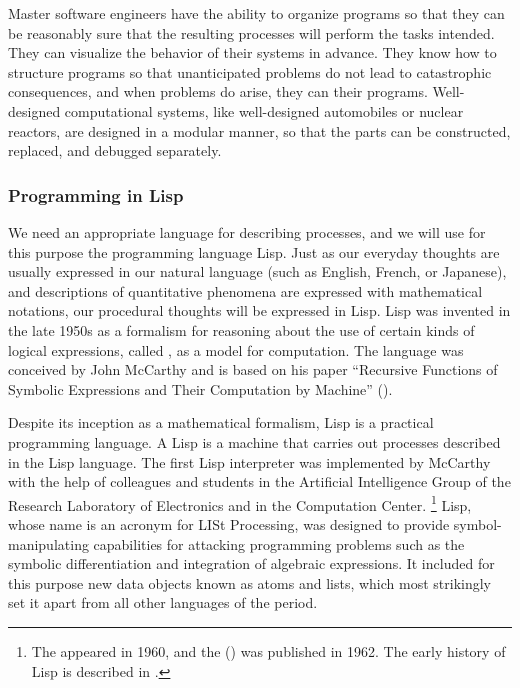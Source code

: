 Master software engineers have the ability to organize programs so that they can be reasonably sure that the resulting processes will perform the tasks intended.
They can visualize the behavior of their systems in advance.
They know how to structure programs so that unanticipated problems do not lead to catastrophic consequences, and when problems do arise, they can  their programs.
Well-designed computational systems, like well-designed automobiles or nuclear reactors, are designed in a modular manner, so that the parts can be constructed, replaced, and debugged separately.

\subsubsection*{Programming in Lisp}

We need an appropriate language for describing processes, and we will use for this purpose the programming language Lisp.
Just as our everyday thoughts are usually expressed in our natural language (such as English, French, or Japanese), and descriptions of quantitative phenomena are expressed with mathematical notations, our procedural thoughts will be expressed in Lisp.
Lisp was invented in the late 1950s as a formalism for reasoning about the use of certain kinds of logical expressions, called , as a model for computation.
The language was conceived by John McCarthy and is based on his paper “Recursive Functions of Symbolic Expressions and Their Computation by Machine” ().

Despite its inception as a mathematical formalism, Lisp is a practical programming language.
A Lisp  is a machine that carries out processes described in the Lisp language.
The first Lisp interpreter was implemented by McCarthy with the help of colleagues and students in the Artificial Intelligence Group of the  Research Laboratory of Electronics and in the  Computation Center.%
\footnote{
	The  appeared in 1960, and the  () was published in 1962.
	The early history of Lisp is described in .
}
Lisp, whose name is an acronym for LISt Processing, was designed to provide symbol-manipulating capabilities for attacking programming problems such as the symbolic differentiation and integration of algebraic expressions.
It included for this purpose new data objects known as atoms and lists, which most strikingly set it apart from all other languages of the period.

